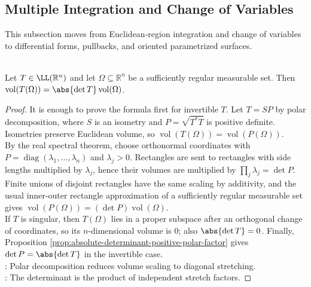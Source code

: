 \subsection{Multiple Integration and Change of Variables}

%

This subsection moves from Euclidean-region integration and change of variables to differential forms, pullbacks, and oriented parametrized surfaces.

\begin{theorem} \label{thm:linear-map-volume-scaling-determinant} \\
Let $T\in\LL(\mathbb{R}^n)$ and let $\Omega\subseteq\mathbb{R}^n$ be a sufficiently regular measurable set. Then $\operatorname{vol}(T(\Omega))=\abs{\det T}\operatorname{vol}(\Omega)$.
\begin{proof}
It is enough to prove the formula first for invertible $T$. Let $T=SP$ by polar decomposition, where $S$ is an isometry and $P=\sqrt{T^*T}$ is positive definite. Isometries preserve Euclidean volume, so $\operatorname{vol}(T(\Omega))=\operatorname{vol}(P(\Omega))$.\\
By the real spectral theorem, choose orthonormal coordinates with $P=\operatorname{diag}(\lambda_1,\ldots,\lambda_n)$ and $\lambda_j>0$. Rectangles are sent to rectangles with side lengths multiplied by $\lambda_j$, hence their volumes are multiplied by $\prod_j\lambda_j=\det P$. Finite unions of disjoint rectangles have the same scaling by additivity, and the usual inner-outer rectangle approximation of a sufficiently regular measurable set gives $\operatorname{vol}(P(\Omega))=(\det P)\operatorname{vol}(\Omega)$.\\
If $T$ is singular, then $T(\Omega)$ lies in a proper subspace after an orthogonal change of coordinates, so its $n$-dimensional volume is $0$; also $\abs{\det T}=0$. Finally, Proposition \ref{prop:absolute-determinant-positive-polar-factor} gives $\det P=\abs{\det T}$ in the invertible case.\\
: Polar decomposition reduces volume scaling to diagonal stretching.\\
: The determinant is the product of independent stretch factors.
\end{proof}
\end{theorem}

